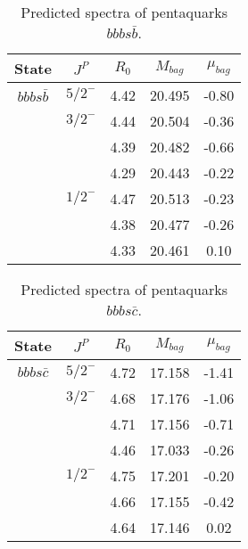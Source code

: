 \documentclass[prd,twocolumn,floatfix,nofootinbib]{revtex4}
\begin{document}
\renewcommand{\tabcolsep}{0.5cm}
\renewcommand{\arraystretch}{1.2}
\begin{table*}[!htbp]
    \caption{Predicted spectra of pentaquarks $bbbs\bar{b}$.}
    \begin{tabular}{ccccc}
        \hline\hline
        {\rm State} &$J^{P}$ &$R_{0}$ &$M_{bag}$ &$\mu_{bag}$ \\ \hline
        ${bbbs\bar{b}}$
            &${5/2}^{-}$    &4.42   &20.495 &-0.80 \\
            &${3/2}^{-}$    &4.44   &20.504 &-0.36 \\
            &               &4.39   &20.482 &-0.66 \\
            &               &4.29   &20.443 &-0.22 \\
            &${1/2}^{-}$    &4.47   &20.513 &-0.23 \\
            &               &4.38   &20.477 &-0.26 \\
            &               &4.33   &20.461 &0.10 \\
        \hline\hline 
    \end{tabular}
\end{table*}

\renewcommand{\tabcolsep}{0.5cm}
\renewcommand{\arraystretch}{1.2}
\begin{table*}[!htbp]
    \caption{Predicted spectra of pentaquarks $bbbs\bar{c}$.}
    \begin{tabular}{ccccc}
        \hline\hline
        {\rm State} &$J^{P}$ &$R_{0}$ &$M_{bag}$ &$\mu_{bag}$ \\ \hline
        ${bbbs\bar{c}}$
            &${5/2}^{-}$    &4.72   &17.158 &-1.41 \\
            &${3/2}^{-}$    &4.68   &17.176 &-1.06 \\
            &               &4.71   &17.156 &-0.71 \\
            &               &4.46   &17.033 &-0.26 \\
            &${1/2}^{-}$    &4.75   &17.201 &-0.20 \\
            &               &4.66   &17.155 &-0.42 \\
            &               &4.64   &17.146  &0.02 \\
        \hline\hline 
    \end{tabular}
\end{table*}
\end{document}
